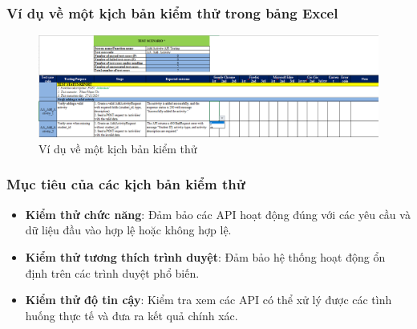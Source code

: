 \subsubsection{Ví dụ về một kịch bản kiểm thử trong bảng Excel}
\begin{figure}[H]
    \centering
    \includegraphics[scale=0.5]{Images/Implement/testScenario.png}
    \caption{Ví dụ về một kịch bản kiểm thử}
\end{figure}
\subsubsection{Mục tiêu của các kịch bản kiểm thử}
\begin{itemize}
    \item \textbf{Kiểm thử chức năng}: Đảm bảo các API hoạt động đúng với các yêu cầu và dữ liệu đầu vào hợp lệ hoặc không hợp lệ. 
    \item \textbf{Kiểm thử tương thích trình duyệt}: Đảm bảo hệ thống hoạt động ổn định trên các trình duyệt phổ biến.
    \item \textbf{Kiểm thử độ tin cậy}: Kiểm tra xem các API có thể xử lý được các tình huống thực tế và đưa ra kết quả chính xác.
\end{itemize}
